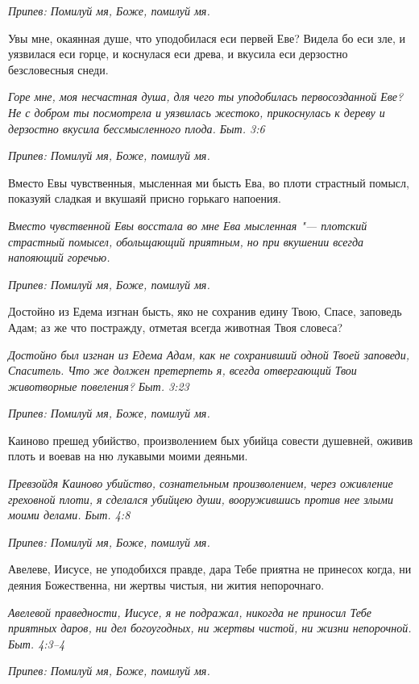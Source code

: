 \itshape Припев:\normalfont{} Помилуй мя, Боже, помилуй мя.


Увы мне, окаянная душе, что уподобилася еси первей Еве? Видела бо еси зле, и уязвилася еси горце, и коснулася еси древа, и вкусила еси дерзостно безсловесныя снеди.


\itshape Горе мне, моя несчастная душа, для чего ты уподобилась первосозданной Еве? Не с добром ты посмотрела и уязвилась жестоко, прикоснулась к дереву и дерзостно вкусила бессмысленного плода. Быт. 3:6\normalfont{}


\itshape Припев:\normalfont{} Помилуй мя, Боже, помилуй мя.


Вместо Евы чувственныя, мысленная ми бысть Ева, во плоти страстный помысл, показуяй сладкая и вкушаяй присно горькаго напоения.


\itshape Вместо чувственной Евы восстала во мне Ева мысленная "--- плотский страстный помысел, обольщающий приятным, но при вкушении всегда напояющий горечью.\normalfont{}


\itshape Припев:\normalfont{} Помилуй мя, Боже, помилуй мя.


Достойно из Едема изгнан бысть, яко не сохранив едину Твою, Спасе, заповедь Адам; аз же что постражду, отметая всегда животная Твоя словеса?


\itshape Достойно был изгнан из Едема Адам, как не сохранивший одной Твоей заповеди, Спаситель. Что же должен претерпеть я, всегда отвергающий Твои животворные повеления? Быт. 3:23\normalfont{}


\itshape Припев:\normalfont{} Помилуй мя, Боже, помилуй мя.


Каиново прешед убийство, произволением бых убийца совести душевней, оживив плоть и воевав на ню лукавыми моими деяньми.


\itshape Превзойдя Каиново убийство, сознательным произволением, через оживление греховной плоти, я сделался убийцею души, вооружившись против нее злыми моими делами. Быт. 4:8\normalfont{}


\itshape Припев:\normalfont{} Помилуй мя, Боже, помилуй мя.


Авелеве, Иисусе, не уподобихся правде, дара Тебе приятна не принесох когда, ни деяния Божественна, ни жертвы чистыя, ни жития непорочнаго.


\itshape Авелевой праведности, Иисусе, я не подражал, никогда не приносил Тебе приятных даров, ни дел богоугодных, ни жертвы чистой, ни жизни непорочной. Быт. 4:3–4\normalfont{}


\itshape Припев:\normalfont{} Помилуй мя, Боже, помилуй мя.


